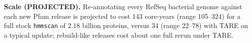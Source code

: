 \documentclass[letterpaper,twocolumn,10pt]{article}
\theoremstyle{definition}
\newcommand{\sys}{TARE\xspace}
\newcommand{\sys}{PARE\xspace}
\begin{document}
\textbf{Scale (PROJECTED).} Re-annotating every RefSeq bacterial genome against each new Pfam release is projected to cost
143 core\nobreakdash-years (range 105--324) for a full stock \texttt{hmmscan} of 2.18 billion proteins, versus 34
(range 22--78) with \sys on a typical update; rebuild-like releases cost about one full rerun under \sys.
\end{document}
